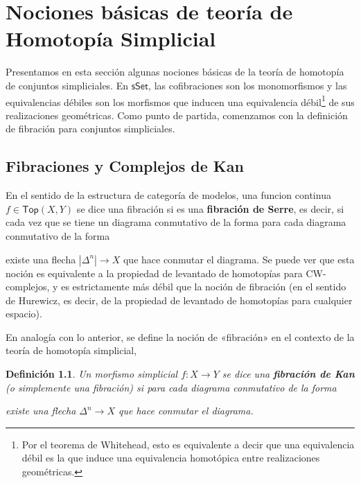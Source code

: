 \documentclass[11pt]{report}
\theoremstyle{colored}
\newtheorem{definition}{Definición}[section]
\newcommand{\cat}[1]{\mathsf{#1}}
\renewcommand{\ss}[1]{\Delta^{#1}}
\newcommand{\horn}[2]{\Lambda^{#1}_{#2}}
\newcommand{\guill}[1]{«#1»}
\begin{document}
\chapter{Nociones básicas de teoría de Homotopía Simplicial}

Presentamos en esta sección algunas nociones básicas de la teoría de homotopía de conjuntos simpliciales. En $\cat{sSet}$, las cofibraciones son los monomorfismos y las equivalencias débiles son los morfismos que inducen una equivalencia débil\footnote{Por el teorema de Whitehead, esto es equivalente a decir que una equivalencia débil es la que induce una equivalencia homotópica entre realizaciones geométricas.} de sus realizaciones geométricas. Como punto de partida, comenzamos con la definición de fibración para conjuntos simpliciales.

\section{Fibraciones y Complejos de Kan}

En el sentido de la estructura de categoría de modelos, una funcion continua $f \in \cat{Top}(X,Y)$ se dice una fibración si es una \textbf{fibración de Serre}, es decir, si cada vez que se tiene un diagrama conmutativo de la forma
para cada diagrama conmutativo de la forma
\begin{center}
\end{center}
existe una flecha $|\ss{n}| \to X$ que hace conmutar el diagrama. Se puede ver que esta noción es equivalente a la propiedad de levantado de homotopías para CW-complejos, y es estrictamente más débil que la noción de fibración (en el sentido de Hurewicz, es decir, de la propiedad de levantado de homotopías para cualquier espacio). 

En analogía con lo anterior, se define la noción de \guill{fibración} en el contexto de la teoría de homotopía simplicial,

\begin{definition} Un morfismo simplicial $f : X \to Y$ se dice una \textbf{fibración de Kan} (o simplemente una fibración) si para cada diagrama conmutativo de la forma
\begin{center}
\end{center}
existe una flecha $\ss{n} \to X$ que hace conmutar el diagrama.
\end{definition}
\end{document}

